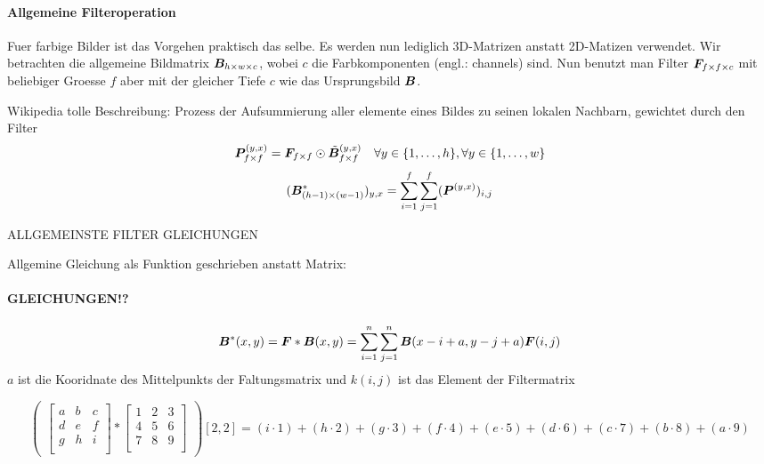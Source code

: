 \documentclass[../main]{subfiles}
\begin{document}
\paragraph{Allgemeine Filteroperation}
Fuer farbige Bilder ist das Vorgehen praktisch das selbe. Es werden nun
lediglich 3D-Matrizen anstatt 2D-Matizen verwendet. Wir betrachten die
allgemeine Bildmatrix $\bm{B}_{h \times w \times c}$, wobei $c$ die
Farbkomponenten (engl.: channels) sind.
Nun benutzt man Filter $\bm{F}_{f \times f \times c}$ mit beliebiger Groesse
$f$ aber mit der gleicher Tiefe $c$ wie das Ursprungsbild $\bm{B}$.

Wikipedia tolle Beschreibung: Prozess der Aufsummierung aller elemente eines
Bildes zu seinen lokalen Nachbarn, gewichtet durch den Filter
\begin{equation}
  \bm{P}^{(y,x)}_{f \times f} = \bm{F}_{f \times f} \odot \tilde{\bm{B}}^{(y,x)}_{f \times f} \quad \forall y \in \{1,\ldots,h\}, \forall y \in \{1,\ldots,w\}
\end{equation}
\begin{equation}
  (\bm{B}_{(h-1) \times (w-1)}^*)_{y,x} = \sum_{i=1}^f \sum_{j=1}^f (\bm{P}^{(y,x)})_{i,j}
\end{equation}

ALLGEMEINSTE FILTER GLEICHUNGEN

Allgemine Gleichung als Funktion geschrieben anstatt Matrix:



\paragraph{GLEICHUNGEN!?}
\begin{equation}
  \bm{B}^*(x,y) = \bm{F} * \bm{B}(x,y) = \sum_{i=1}^n \sum_{j=1}^n \bm{B}(x-i+a, y-j+a)\bm{F}(i,j)
\end{equation}
$a$ ist die Kooridnate des Mittelpunkts der Faltungsmatrix und $k(i,j)$ ist das
Element der Filtermatrix

\begin{equation}
  \begin{pmatrix}
    \begin{bmatrix}
      a & b & c \\
      d & e & f \\
      g & h & i \\
    \end{bmatrix}
    *
    \begin{bmatrix}
      1 & 2 & 3 \\
      4 & 5 & 6 \\
      7 & 8 & 9 \\
    \end{bmatrix}
  \end{pmatrix}
  [2,2]
  = (i \cdot 1) + (h \cdot 2) + (g \cdot 3) + (f \cdot 4) + (e \cdot 5) + (d \cdot 6) + (c \cdot 7) + (b \cdot 8) + (a \cdot 9)
\end{equation}
\end{document}

